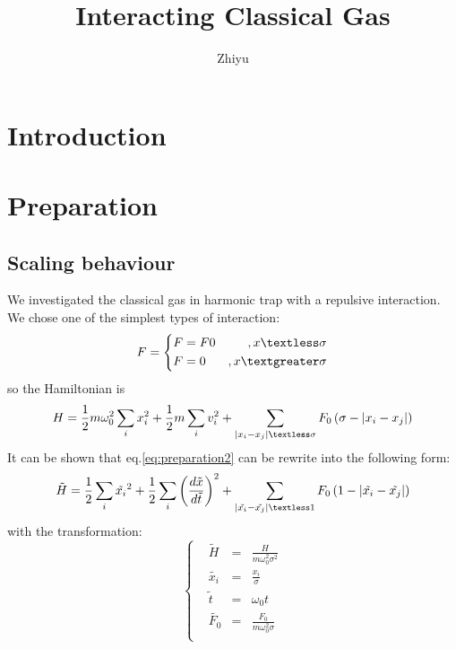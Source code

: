 \documentclass[aps,pre,twocolumn
,groupedaddress]{revtex4-1}
\begin{document}
 \title{Interacting Classical Gas}
 \author{Zhiyu}
\begin{abstract}
\end{abstract}
 \maketitle
\section{Introduction}


\section{Preparation}
\subsection{Scaling behaviour}
We investigated the classical gas in harmonic trap with a repulsive interaction. We chose one of the simplest types of interaction:
\begin{equation}
F=\left\lbrace
\begin{aligned}
&F=F0 	&,x\textless\sigma\\
&F=0 	&,x\textgreater\sigma
\end{aligned}
\right.
\label{eq:preparation1}
\end{equation}
so the Hamiltonian is
\begin{equation}
H=\frac{1}{2}m\omega_0^2\sum_{i}x_i^2+\frac{1}{2}m\sum_i v_i^2+\sum_{\left|x_i-x_j\right|\textless\sigma}F_0\left(\sigma-\left|x_i-x_j\right|\right)
\label{eq:preparation2}
\end{equation}
It can be shown that eq.\ref{eq:preparation2} can be rewrite into the following form:
\begin{equation}
\tilde{H}=\frac{1}{2}\sum_{i}\tilde{x_i}^2+\frac{1}{2}\sum_i\left(\frac{d\tilde{x}}{d\tilde{t}}\right)^2+\sum_{\left|\tilde{x_i}-\tilde{x_j}\right|\textless 1}F_0\left(1-\left|\tilde{x_i}-\tilde{x_j}\right|\right)
\end{equation}
with the transformation:
\begin{equation}
\left\lbrace
\begin{aligned}
&\tilde{H}&=&\frac{H}{m\omega_0^2\sigma^2}\\
&\tilde{x_i}&=&\frac{x_i}{\sigma}\\
&\tilde{t}&=&\omega_0t\\
&\tilde{F_0}&=&\frac{F_0}{m\omega_0^2\sigma}\\
\end{aligned}
\right.
\end{equation}
\end{document}
